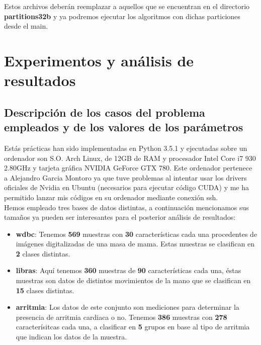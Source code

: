 \documentclass[10pt,a4paper]{article}
\begin{document}
Estos archivos deberán reemplazar a aquellos que se encuentran en el directorio \textbf{partitions32b} y ya podremos ejecutar los algoritmos con dichas particiones desde el main.\\

\newpage
\section{\color[rgb]{0.0,0.0,0.21}Experimentos y análisis de resultados}

\subsection{\color[rgb]{0.0,0.0,0.51}Descripción de los casos del problema empleados y de los valores de los parámetros}


Estás prácticas han sido implementadas en Python 3.5.1 y ejecutadas sobre un ordenador son S.O. Arch Linux, de 12GB de RAM y procesador Intel Core i7 930 2.80GHz y tarjeta gráfica NVIDIA GeForce GTX 780. Este ordenador pertenece a Alejandro Garcia Montoro ya que tuve problemas al intentar usar los drivers oficiales de Nvidia en Ubuntu (necesarios para ejecutar código CUDA) y me ha permitido lanzar mis códigos en su ordenador mediante conexión ssh.\\

Hemos empleado tres bases de datos distintas, a continuación mencionamos sus tamaños ya pueden ser interesantes para el posterior análisis de resultados:\\

\begin{itemize}
\item \textbf{wdbc}: Tenemos \textbf{569} muestras con \textbf{30} características cada una procedentes de imágenes digitalizadas de una masa de mama. Estas muestras se clasifican en \textbf{2} clases distintas.
\item \textbf{libras}: Aquí tenemos \textbf{360} muestras de \textbf{90} características cada una, éstas muestras son datos de distintos movimientos de la mano que se clasifican en \textbf{15} clases distintas.
\item \textbf{arritmia}: Los datos de este conjunto son mediciones para determinar la presencia de arritmia cardiaca o no. Tenemos \textbf{386} muestras con \textbf{278} caracterísitcas cada una, a clasificar en \textbf{5} grupos en base al tipo de arritmia que indican los datos de la muestra.
\end{itemize}
\end{document}
